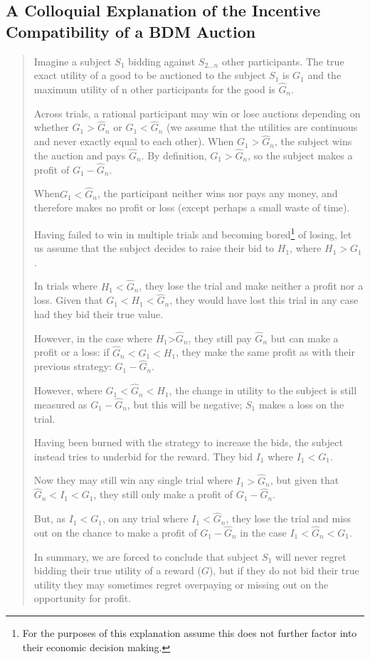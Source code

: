 \subsection{A Colloquial Explanation of the Incentive Compatibility of a BDM Auction}
\begin{quote}

Imagine a subject $S_1$ bidding against $S_{2...n}$ other participants. The true exact utility of a good to be auctioned to the subject $S_1$ is $G_1$ and the maximum utility of n other participants for the good is $\hat{G}_n$.

Across trials, a rational participant may win or lose auctions depending on whether $G_1>\hat{G}_n$ or $G_1<\hat{G}_n$ (we assume that the utilities are continuous and never exactly equal to each other). When $G_1>\hat{G}_n$, the subject wins the auction and pays $\hat{G}_n$. By definition, $G_1>\hat{G}_n$, so the subject makes a profit of $G_1- \hat{G}_n$.

When$G_1<\hat{G}_n$, the participant neither wins nor pays any money, and therefore makes no profit or loss (except perhaps a small waste of time).

Having failed to win in multiple trials and becoming bored\footnote{For the purposes of this explanation assume this does not further factor into their economic decision making.} of losing, let us assume that the subject decides to raise their bid to $H_1$, where $H_1> G_1$. 

In trials where $H_1<\hat{G}_n$, they lose the trial and make neither a profit nor a loss. Given that $G_1<H_1<\hat{G}_n$, they would have lost this trial in any case had they bid their true value.

However, in the case where $H_1$>$\hat{G}_n$, they still pay $\hat{G}_n$ but can make a profit or a loss: if $\hat{G}_n<G_1<H_1$, they make the same profit as with their previous strategy: $G_1-\hat{G}_n$. 

However, where $G_1<\hat{G}_n<H_1$, the change in utility to the subject is still measured as $G_1-\hat{G}_n$, but this will be negative; $S_1$ makes a loss on the trial.

Having been burned with the strategy to increase the bids, the subject instead tries to underbid for the reward. They bid $I_1$ where $I_1< G_1$.

Now they may still win any single trial where $I_1>\hat{G}_n$, but given that $\hat{G}_n<I_1<G_1$, they still only make a profit of $G_1-\hat{G}_n$.

But, as $I_1< G_1$, on any trial where $I_1<\hat{G}_n$, they lose the trial and miss out on the chance to make a profit of $G_1-\hat{G}_n$ in the case $I_1<\hat{G}_n<G_1$.

In summary, we are forced to conclude that subject $S_1$ will never regret bidding their true utility of a reward ($G$), but if they do not bid their true utility they may sometimes regret overpaying or missing out on the opportunity for profit.
\end{quote}

